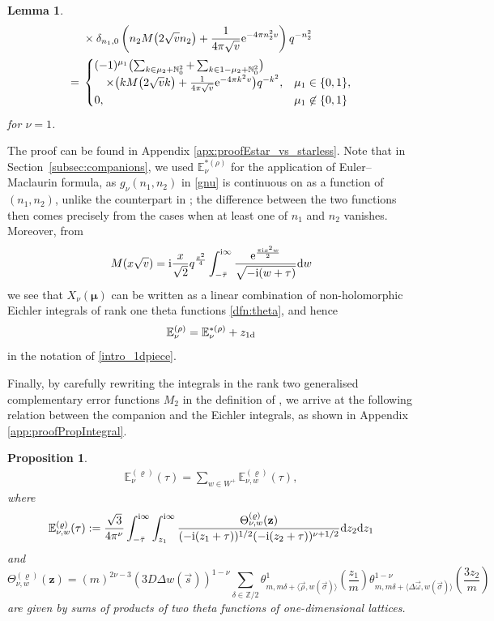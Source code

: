 \documentclass[10pt,a4paper]{amsart}
\def\be{\begin{equation}} \def\ee{\end{equation}}
\def\BN{\mathbb{N}}
\def\BZ{\mathbb{Z}}
\def\BE{\mathbb{E}}
\def\bos{\varrho}
\def\bmu{\boldsymbol{\mu}}
\newtheorem{prop}[thm]{Proposition}
\newtheorem{lem}[thm]{Lemma}
\theoremstyle{definition}
\numberwithin{equation}{section}
\begin{document}
\begin{lem}
\begin{align*}
&\times \delta_{n_{1},0}\left( n_{2}M\bigl( 2\sqrt{v}n_{2} \bigr)+\frac{1}{4\pi\sqrt{v}}{\rm e}^{-4\pi n_{2}^{2}v} \right)q^{-n_{2}^2} \\
 ={}& \begin{cases}
( -1 )^{\mu_{1}}\bigl( \sum_{k\in\mu_{2}+\BN_{0}^{2}}+\sum_{k\in1-\mu_{2}+\BN_{0}^{2}} \bigr)\\
\quad\times\bigl( kM\bigl( 2\sqrt{v}k \bigr)+\frac{1}{4\pi\sqrt{v}}{\rm e}^{-4\pi k^{2}v} \bigr)q^{-k^{2}}, & \mu_{1}\in \{ 0,1 \},\\
 0, & \mu_{1}\not\in\{ 0,1 \}
 \end{cases}
\end{align*}
for $\nu = 1$.

\end{lem}
The proof can be found in Appendix \ref{apx:proofEstar_vs_starless}.
Note that in Section~\ref{subsec:companions}, we used $\mathbb{E}^{*(\rho)}_{\nu}$ for the application of Euler--Maclaurin formula, as $g_\nu(n_1,n_2)$ in \eqref{gnu} is continuous on  as a function of $(n_1,n_2)$, unlike the counterpart in ; the difference between the two functions then comes precisely from the cases when at least one of $n_1$ and $n_2$ vanishes. Moreover, from \cite{zwegers2008mock}
\[
M(x\sqrt{v})={\rm i}\frac{x}{\sqrt{2}} q^{\frac{x^2}{4}} \int_{-\bar{\tau}}^{{\rm i}\infty} \frac{{\rm e}^{\frac{\pi {\rm i} x^2 w}{2}}}{\sqrt{-{\rm i}(w+\tau)}}{\rm d}w
\]
we see that $X_\nu(\bmu)$ can be written as a linear combination of non-holomorphic Eichler integrals of rank one theta functions \eqref{dfn:theta}, and hence
\begin{equation*}
\mathbb{E}^{(\rho)}_{\nu}=\mathbb{E}^{*(\rho)}_{\nu} + z_{1\rm d}
\end{equation*}
in the notation of \eqref{intro_1dpiece}.

Finally, by carefully rewriting the integrals in the rank two generalised complementary error functions $M_2$ in the definition of \smash{$\BE_\nu^{(\bos)}$}, we arrive at the following relation between the companion and the Eichler integrals, as shown in Appendix \ref{app:proofPropIntegral}.

\begin{prop}\label{prop:Estarless_eichler}
\begin{gather*} %
	\BE_\nu^{(\bos)}(\tau) = \sum_{{w} \in W^+} \BE_{\nu,w}^{(\bos)}(\tau),
 \end{gather*}
where
\be\label{Eichler_Enu_Com}
	\BE_{\nu,w}^{(\bos)}(\tau) := \frac{\sqrt{3}}{4 \pi^{\nu}}
	\int_{-\bar{\tau}}^{{\rm i} \infty}\int_{z_1}^{{\rm i} \infty}
	\frac{ \Theta_{\nu,w}^{(\bos)}(
	{\bf z})}{({-{\rm i}(z_1+\tau)})^{1/2} (-{\rm i}(z_2+\tau))^{\nu+1/2}}{\rm d}z_2{\rm d}z_1
\ee
and
\be\label{def:Theta}
 \Theta_{\nu,w}^{(\bos)}(\mathbf{z}) = (m)^{2\nu-3}	\left( {3D\Delta w(\vec{s})} \right)^{1-\nu} \sum_{\delta\in\BZ/2}
\theta^1_{m,m\delta + \langle\vec{\rho},w(\vec{\sigma})\rangle} \left(\frac{z_1}{m}\right)
\theta^{1-\nu}_{m,m\delta + \langle \Delta\vec\omega, w(\vec{\sigma})\rangle}\left(\frac{3z_2}{m} \right)
\ee
are given by sums of products of two theta functions of one-dimensional lattices.
\end{prop}
\end{document}
